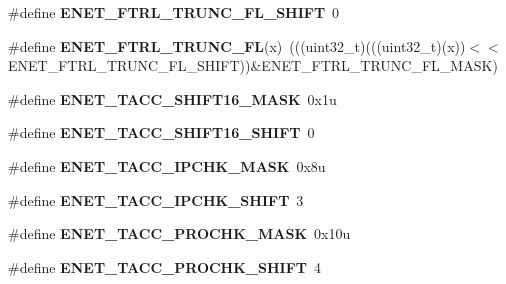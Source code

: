 \begin{DoxyCompactItemize}
\item 
\#define {\bfseries E\+N\+E\+T\+\_\+\+F\+T\+R\+L\+\_\+\+T\+R\+U\+N\+C\+\_\+\+F\+L\+\_\+\+S\+H\+I\+FT}~0\hypertarget{group__ENET__Register__Masks_gabde46c4ee41f8745b475d4d715455332}{}\label{group__ENET__Register__Masks_gabde46c4ee41f8745b475d4d715455332}

\item 
\#define {\bfseries E\+N\+E\+T\+\_\+\+F\+T\+R\+L\+\_\+\+T\+R\+U\+N\+C\+\_\+\+FL}(x)~(((uint32\+\_\+t)(((uint32\+\_\+t)(x))$<$$<$E\+N\+E\+T\+\_\+\+F\+T\+R\+L\+\_\+\+T\+R\+U\+N\+C\+\_\+\+F\+L\+\_\+\+S\+H\+I\+FT))\&E\+N\+E\+T\+\_\+\+F\+T\+R\+L\+\_\+\+T\+R\+U\+N\+C\+\_\+\+F\+L\+\_\+\+M\+A\+SK)\hypertarget{group__ENET__Register__Masks_ga82b2ab08109ba85730009d0705983cb1}{}\label{group__ENET__Register__Masks_ga82b2ab08109ba85730009d0705983cb1}

\item 
\#define {\bfseries E\+N\+E\+T\+\_\+\+T\+A\+C\+C\+\_\+\+S\+H\+I\+F\+T16\+\_\+\+M\+A\+SK}~0x1u\hypertarget{group__ENET__Register__Masks_ga88e7d546b2d5198aaecb2755eeaca679}{}\label{group__ENET__Register__Masks_ga88e7d546b2d5198aaecb2755eeaca679}

\item 
\#define {\bfseries E\+N\+E\+T\+\_\+\+T\+A\+C\+C\+\_\+\+S\+H\+I\+F\+T16\+\_\+\+S\+H\+I\+FT}~0\hypertarget{group__ENET__Register__Masks_gad6be72a0d8613b7d2e2a173821caf724}{}\label{group__ENET__Register__Masks_gad6be72a0d8613b7d2e2a173821caf724}

\item 
\#define {\bfseries E\+N\+E\+T\+\_\+\+T\+A\+C\+C\+\_\+\+I\+P\+C\+H\+K\+\_\+\+M\+A\+SK}~0x8u\hypertarget{group__ENET__Register__Masks_gae79332fd3040e628268621a4525f8ce1}{}\label{group__ENET__Register__Masks_gae79332fd3040e628268621a4525f8ce1}

\item 
\#define {\bfseries E\+N\+E\+T\+\_\+\+T\+A\+C\+C\+\_\+\+I\+P\+C\+H\+K\+\_\+\+S\+H\+I\+FT}~3\hypertarget{group__ENET__Register__Masks_gaf007c15a11d87397188a6d940575309f}{}\label{group__ENET__Register__Masks_gaf007c15a11d87397188a6d940575309f}

\item 
\#define {\bfseries E\+N\+E\+T\+\_\+\+T\+A\+C\+C\+\_\+\+P\+R\+O\+C\+H\+K\+\_\+\+M\+A\+SK}~0x10u\hypertarget{group__ENET__Register__Masks_gad5d647fe5be39e4571d94f84415f4613}{}\label{group__ENET__Register__Masks_gad5d647fe5be39e4571d94f84415f4613}

\item 
\#define {\bfseries E\+N\+E\+T\+\_\+\+T\+A\+C\+C\+\_\+\+P\+R\+O\+C\+H\+K\+\_\+\+S\+H\+I\+FT}~4\hypertarget{group__ENET__Register__Masks_ga1ab45d57f4375fd64bc08ca9cb53341b}{}\label{group__ENET__Register__Masks_ga1ab45d57f4375fd64bc08ca9cb53341b}


\end{DoxyCompactItemize}
